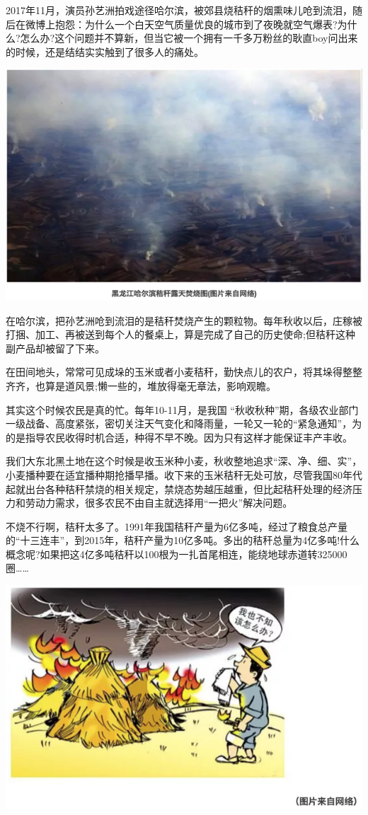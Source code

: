\documentclass[]{book}
\begin{document}
2017年11月，演员孙艺洲拍戏途径哈尔滨，被郊县烧秸秆的烟熏味儿呛到流泪，随后在微博上抱怨：为什么一个白天空气质量优良的城市到了夜晚就空气爆表?为什么?怎么办?这个问题并不算新，但当它被一个拥有一千多万粉丝的耿直boy问出来的时候，还是结结实实触到了很多人的痛处。

\includegraphics[width=8.33in]{images/stalk1}

在哈尔滨，把孙艺洲呛到流泪的是秸秆焚烧产生的颗粒物。每年秋收以后，庄稼被打捆、加工、再被送到每个人的餐桌上，算是完成了自己的历史使命;但秸秆这种副产品却被留了下来。

在田间地头，常常可见成垛的玉米或者小麦秸秆，勤快点儿的农户，将其垛得整整齐齐，也算是道风景;懒一些的，堆放得毫无章法，影响观瞻。

其实这个时候农民是真的忙。每年10-11月，是我国
``秋收秋种''期，各级农业部门一级战备、高度紧张，密切关注天气变化和降雨量，一轮又一轮的``紧急通知''，为的是指导农民收得时机合适，种得不早不晚。因为只有这样才能保证丰产丰收。

我们大东北黑土地在这个时候是收玉米种小麦，秋收整地追求``深、净、细、实''，小麦播种要在适宜播种期抢播早播。收下来的玉米秸秆无处可放，尽管我国80年代起就出台各种秸秆禁烧的相关规定，禁烧态势越压越重，但比起秸秆处理的经济压力和劳动力需求，很多农民不由自主就选择用``一把火''解决问题。

不烧不行啊，秸秆太多了。1991年我国秸秆产量为6亿多吨，经过了粮食总产量的``十三连丰''，到2015年，秸秆产量为10亿多吨。多出的秸秆总量为4亿多吨!什么概念呢?如果把这4亿多吨秸秆以100根为一扎首尾相连，能绕地球赤道转325000圈\ldots{}\ldots{}

\includegraphics[width=8.33in]{images/stalk2}
\end{document}
